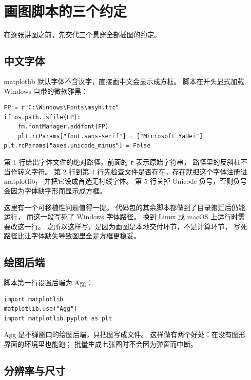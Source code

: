 \documentclass[11pt,a4paper]{article}
\begin{document}
\newpage
\tableofcontents
\newpage

\section{画图脚本的三个约定}

在逐张讲图之前，先交代三个贯穿全部插图的约定。

\subsection{中文字体}

matplotlib 默认字体不含汉字，直接画中文会显示成方框。
脚本在开头显式加载 Windows 自带的微软雅黑：

\begin{lstlisting}
FP = r"C:\Windows\Fonts\msyh.ttc"
if os.path.isfile(FP):
    fm.fontManager.addfont(FP)
    plt.rcParams["font.sans-serif"] = ["Microsoft YaHei"]
plt.rcParams["axes.unicode_minus"] = False
\end{lstlisting}

第 1 行给出字体文件的绝对路径，前面的 \texttt{r} 表示原始字符串，
路径里的反斜杠不当作转义字符。
第 2 行到第 4 行先检查文件是否存在，存在就把这个字体注册进 matplotlib，
并把它设成首选无衬线字体。
第 5 行关掉 Unicode 负号，否则负号会因为字体缺字形而显示成方框。

这里有一个可移植性问题值得一提。
代码包的其余脚本都做到了目录搬迁后仍能运行，
而这一段写死了 Windows 字体路径。
换到 Linux 或 macOS 上运行时需要改这一行。
之所以这样写，是因为画图是本地交付环节，不是计算环节，
写死路径比让字体缺失导致图里全是方框更稳妥。

\subsection{绘图后端}

脚本第一行设置后端为 Agg：

\begin{lstlisting}
import matplotlib
matplotlib.use("Agg")
import matplotlib.pyplot as plt
\end{lstlisting}

Agg 是不弹窗口的绘图后端，只把图写成文件。
这样做有两个好处：在没有图形界面的环境里也能跑；
批量生成七张图时不会因为弹窗而中断。

\subsection{分辨率与尺寸}
\end{document}
